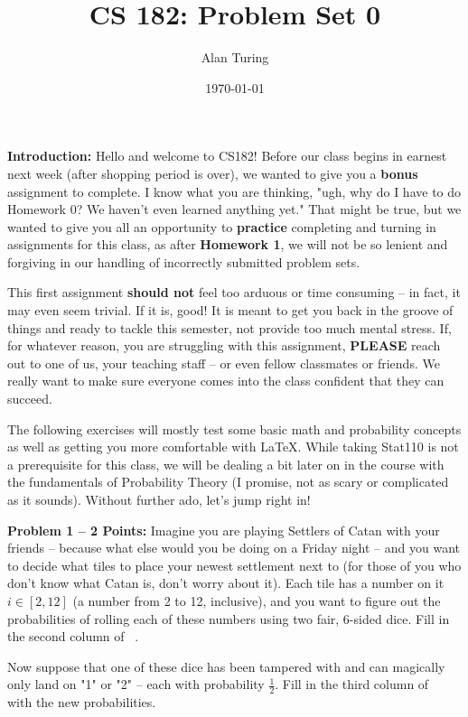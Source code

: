 \documentclass[]{article}
\title{CS 182: Problem Set 0}
\author{Alan Turing}
\date{\today}
\begin{document}
\maketitle

\textbf{Introduction:}  
Hello and welcome to CS182!  Before our class begins in earnest next week (after shopping period is over), we wanted to give you a \textbf{bonus} assignment to complete.  I know what you are thinking, "ugh, why do I have to do Homework 0?  We haven't even learned anything yet."  That might be true, but we wanted to give you all an opportunity to \textbf{practice} completing and turning in assignments for this class, as after \textbf{Homework 1}, we will not be so lenient and forgiving in our handling of incorrectly submitted problem sets.

This first assignment \textbf{should not} feel too arduous or time consuming -- in fact, it may even seem trivial.  If it is, good!  It is meant to get you back in the groove of things and ready to tackle this semester, not provide too much mental stress.  If, for whatever reason, you are struggling with this assignment, \textbf{PLEASE} reach out to one of us, your teaching staff -- or even fellow classmates or friends.  We really want to make sure everyone comes into the class confident that they can succeed.

The following exercises will mostly test some basic math and probability concepts as well as getting you more comfortable with \LaTeX.  While taking Stat110 is not a prerequisite for this class, we will be dealing a bit later on in the course with the fundamentals of Probability Theory (I promise, not as scary or complicated as it sounds).  Without further ado, let's jump right in!

\clearpage

\textbf{Problem 1 -- 2 Points:}
Imagine you are playing Settlers of Catan with your friends -- because what else would you be doing on a Friday night -- and you want to decide what tiles to place your newest settlement next to (for those of you who don't know what Catan is, don't worry about it).  Each tile has a number on it $i \in [2,12]$ (a number from 2 to 12, inclusive), and you want to figure out the probabilities of rolling each of these numbers using two fair, 6-sided dice.  Fill in the second column of ~.

Now suppose that one of these dice has been tampered with and can magically only land on "1" or "2" -- each with probability $\frac{1}{2}$.  Fill in the third column of ~ with the new probabilities.
\end{document}
